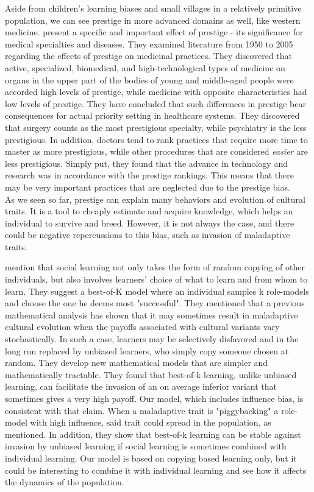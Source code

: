 \documentclass[11pt]{article}
\begin{document}
Aside from children's learning biases and small villages in a relatively primitive population, we can see prestige in more advanced domains as well, like western medicine.\citet{medical_prestige} present a specific and important effect of prestige - its significance for medical specialties and diseases.
They examined literature from 1950 to 2005 regarding the effects of prestige on medicinal practices. They discovered that active, specialized, biomedical, and high-technological types of medicine on organs in the upper part of the bodies of young and middle-aged people were accorded high levels of prestige, while medicine with opposite characteristics had low levels of prestige. They have concluded that such differences in prestige bear consequences for actual priority setting in healthcare systems. They discovered that surgery counts as the most prestigious specialty, while psychiatry is the less prestigious. In addition, doctors tend to rank practices that require more time to master as more prestigious, while other procedures that are considered \textit{easier} are less prestigious. Simply put, they found that the advance in technology and research was in accordance with the prestige rankings.
This means that there may be very important practices that are neglected due to the prestige bias.\\

As we seen so far, prestige can explain many behaviors and evolution of cultural traits. It is a tool to cheaply estimate and acquire knowledge, which helps an individual to survive and breed. However, it is not always the case, and there could be negative repercussions to this bias, such as invasion of maladaptive traits.

\citet{best_of_k} mention that social learning not only takes the form of random copying of other individuals, but also involves learners’ choice of what to learn and from whom to learn. They suggest a best-of-K model where an individual samples k role-models and choose the one he deems most "successful". They mentioned that a previous mathematical analysis has shown that it may sometimes result in maladaptive cultural evolution when the payoffs associated with cultural variants vary stochastically. In such a case, learners may be selectively disfavored and in the long run replaced by unbiased learners, who simply copy someone chosen at random. They develop new mathematical models that are simpler and mathematically tractable. They found that best-of-k learning, unlike unbiased learning, can facilitate the invasion of an on average inferior variant that sometimes gives a very high payoff. Our model, which includes influence bias, is consistent with that claim. When a maladaptive trait is "piggybacking" a role-model with high influence, said trait could spread in the population, as mentioned. In addition, they show that best-of-k learning can be stable against invasion by unbiased learning if social learning is sometimes combined with individual learning. Our model is based on copying based learning only, but it could be interesting to combine it with individual learning and see how it affects the dynamics of the population.
\end{document}
